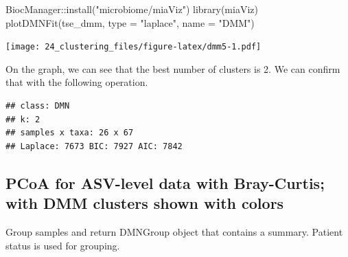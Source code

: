\documentclass[
]{book}
\newenvironment{Shaded}{\begin{snugshade}}{\end{snugshade}}
\newcommand{\AttributeTok}[1]{\textcolor[rgb]{0.77,0.63,0.00}{#1}}
\newcommand{\CommentTok}[1]{\textcolor[rgb]{0.56,0.35,0.01}{\textit{#1}}}
\newcommand{\DecValTok}[1]{\textcolor[rgb]{0.00,0.00,0.81}{#1}}
\newcommand{\FunctionTok}[1]{\textcolor[rgb]{0.00,0.00,0.00}{#1}}
\newcommand{\NormalTok}[1]{#1}
\newcommand{\OtherTok}[1]{\textcolor[rgb]{0.56,0.35,0.01}{#1}}
\newcommand{\SpecialCharTok}[1]{\textcolor[rgb]{0.00,0.00,0.00}{#1}}
\newcommand{\StringTok}[1]{\textcolor[rgb]{0.31,0.60,0.02}{#1}}
\begin{document}
\begin{Shaded}
\begin{Highlighting}[]
\NormalTok{BiocManager}\SpecialCharTok{::}\FunctionTok{install}\NormalTok{(}\StringTok{"microbiome/miaViz"}\NormalTok{)}
\FunctionTok{library}\NormalTok{(miaViz)}
\FunctionTok{plotDMNFit}\NormalTok{(tse\_dmm, }\AttributeTok{type =} \StringTok{"laplace"}\NormalTok{, }\AttributeTok{name =} \StringTok{"DMM"}\NormalTok{)}
\end{Highlighting}
\end{Shaded}

\texttt{[image: 24\_clustering\_files/figure-latex/dmm5-1.pdf]}

On the graph, we can see that the best number of clusters is 2. We can confirm
that with the following operation.

\begin{Shaded}
\end{Shaded}

\begin{verbatim}
## class: DMN 
## k: 2 
## samples x taxa: 26 x 67 
## Laplace: 7673 BIC: 7927 AIC: 7842
\end{verbatim}

\hypertarget{pcoa-for-asv-level-data-with-bray-curtis-with-dmm-clusters-shown-with-colors}{%
\subsection{PCoA for ASV-level data with Bray-Curtis; with DMM clusters shown with colors}\label{pcoa-for-asv-level-data-with-bray-curtis-with-dmm-clusters-shown-with-colors}}

Group samples and return DMNGroup object that contains a summary.
Patient status is used for grouping.

\begin{Shaded}
\end{Shaded}
\end{document}
